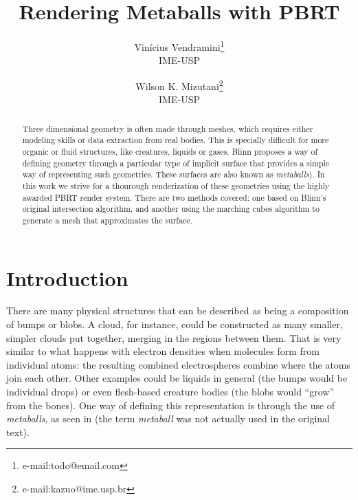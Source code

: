 \documentclass[conference]{acmsiggraph}
\title{Rendering Metaballs with PBRT}
\author{Vinícius Vendramini\thanks{e-mail:todo@email.com}\\IME-USP \and Wilson K. Mizutani\thanks{e-mail:kazuo@ime.usp.br}\\IME-USP}
\begin{document}

\maketitle

\begin{abstract}

Three dimensional geometry is often made through meshes, which requires
either modeling skills or data extraction from real bodies. This is specially
difficult for more organic or fluid structures, like creatures, liquids or
gases. Blinn  proposes a way of defining
geometry through a particular type of implicit surface that provides a simple
way of representing such geometries. These surfaces are also known as
\textit{metaballs}). In this work we strive for a thourough renderization of
these geometries using the highly awarded PBRT
 render system. There are two methods covered:
one based on Blinn's original intersection algorithm, and another using the
marching cubes algorithm \cite{Lorensen:1987:MCH:37402.37422} to generate a mesh
that approximates the surface.

\end{abstract}


\keywordlist


\TOGlinkslist


\copyrightspace

\section{Introduction}

There are many physical structures that can be described as being a composition
of bumps or blobs. A cloud, for instance, could be constructed as many smaller,
simpler clouds put together, merging in the regions between them. That is very
similar to what happens with electron densities when molecules form from
individual atoms: the resulting combined electrospheres combine where the atoms
join each other. Other examples could be liquids in general (the bumps would be
individual drops) or even flesh-based creature bodies (the blobs would ``grow''
from the bones). One way of defining this representation is through the use of
\textit{metaballs}, as seen in \cite{Blinn:1982:GAS:965145.801290} (the term
\textit{metaball} was not actually used in the original text).
\end{document}
